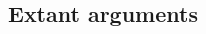 \documentclass[11pt]{article}
\begin{document}
\begin{multicols}{2}


\section{Extant arguments}


\end{multicols}
\end{document}

